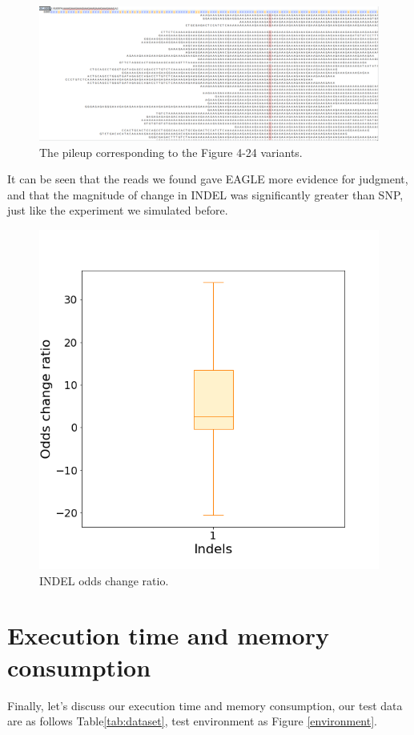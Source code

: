 \begin{figure}[H]
\centering
\includegraphics[width=1\columnwidth]{body/image/indel_pileup_REFread.png}
\caption[Figure 4.24 pileup]{The pileup corresponding to the Figure 4-24 variants.}
\label{indel_pileup_REFread}
\end{figure}

It can be seen that the reads we found gave EAGLE more evidence for judgment, and that the magnitude of change in INDEL was significantly greater than SNP, just like the experiment we simulated before.

\begin{figure}[H]
\centering
\includegraphics[width=0.6\columnwidth]{body/image/indel_odds_change.png}
\caption[INDEL odds change ratio]{INDEL odds change ratio.}
\label{indel_odds_change}
\end{figure}

\section{Execution time and memory consumption}

Finally, let’s discuss our execution time and memory consumption, our test data are as follows Table\ref{tab:dataset}, test environment as Figure \ref{environment}.

